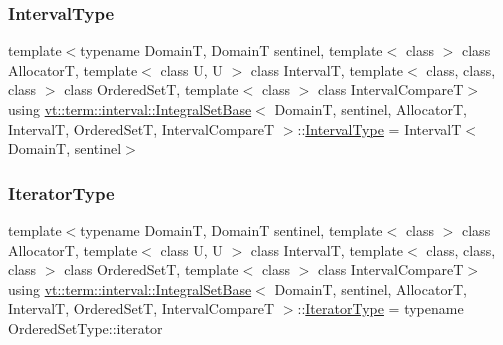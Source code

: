 \mbox{\label{structvt_1_1term_1_1interval_1_1_integral_set_base_a1f8f5bb84064be35bbaaf15bb5a43f14}} 
\subsubsection{\texorpdfstring{Interval\+Type}{IntervalType}}
{\footnotesize\ttfamily template$<$typename DomainT, DomainT sentinel, template$<$ class $>$ class AllocatorT, template$<$ class U, U $>$ class IntervalT, template$<$ class, class, class $>$ class Ordered\+SetT, template$<$ class $>$ class Interval\+CompareT$>$ \\
using \hyperlink{structvt_1_1term_1_1interval_1_1_integral_set_base}{vt\+::term\+::interval\+::\+Integral\+Set\+Base}$<$ DomainT, sentinel, AllocatorT, IntervalT, Ordered\+SetT, Interval\+CompareT $>$\+::\hyperlink{structvt_1_1term_1_1interval_1_1_integral_set_base_a1f8f5bb84064be35bbaaf15bb5a43f14}{Interval\+Type} =  IntervalT$<$DomainT, sentinel$>$}

\mbox{\label{structvt_1_1term_1_1interval_1_1_integral_set_base_a111b2ec1ea960a40ba4270be702f11f1}} 
\subsubsection{\texorpdfstring{Iterator\+Type}{IteratorType}}
{\footnotesize\ttfamily template$<$typename DomainT, DomainT sentinel, template$<$ class $>$ class AllocatorT, template$<$ class U, U $>$ class IntervalT, template$<$ class, class, class $>$ class Ordered\+SetT, template$<$ class $>$ class Interval\+CompareT$>$ \\
using \hyperlink{structvt_1_1term_1_1interval_1_1_integral_set_base}{vt\+::term\+::interval\+::\+Integral\+Set\+Base}$<$ DomainT, sentinel, AllocatorT, IntervalT, Ordered\+SetT, Interval\+CompareT $>$\+::\hyperlink{structvt_1_1term_1_1interval_1_1_integral_set_base_a111b2ec1ea960a40ba4270be702f11f1}{Iterator\+Type} =  typename Ordered\+Set\+Type\+::iterator}

